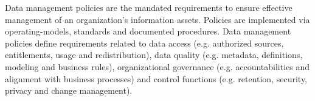 %
%
Data management policies are the mandated requirements to ensure effective management of an organization’s
information assets.
Policies are implemented via \glspl{operating-model},
standards and documented procedures.
Data management policies define requirements related to data access (e.g. authorized sources, entitlements,
usage and redistribution), data quality (e.g. metadata, definitions, modeling and business rules),
organizational governance (e.g. accountabilities and alignment with business processes) and
control functions (e.g. retention, security, privacy and change management).

